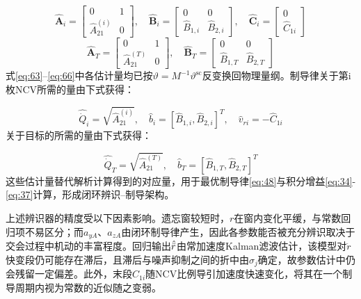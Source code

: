 \begin{equation}
\label{eq:63}
\hat{\mathbf{A}}_{i} = \left[ {\begin{array}{*{20}{c}}
  0&1 \\ 
  {\hat A_{21}^{(i)}}&0 
\end{array}} \right],\quad \hat{\mathbf{B}}_{i} = \left[ {\begin{array}{*{20}{c}}
  0&0 \\ 
  {{{\hat B}_{1,i}}}&{{{\hat B}_{2,i}}} 
\end{array}} \right],\quad \hat{\mathbf{C}}_{i} = \left[ {\begin{array}{*{20}{c}}
  0 \\ 
  {{{\hat C}_{1i}}} 
\end{array}} \right]
\end{equation}
\begin{equation}
\label{eq:64}
\hat{\mathbf{A}}_{T} = \left[ {\begin{array}{*{20}{c}}
  0&1 \\ 
  {\hat A_{21}^{(T)}}&0 
\end{array}} \right],\quad \hat{\mathbf{B}}_{T} = \left[ {\begin{array}{*{20}{c}}
  0&0 \\ 
  {{{\hat B}_{1,T}}}&{{{\hat B}_{2,T}}} 
\end{array}} \right]
\end{equation}
式\eqref{eq:63}--\eqref{eq:66}中各估计量均已按$\vartheta  = {M^{ - 1}}{\vartheta ^{{\text{sc}}}}$反变换回物理量纲。制导律关于第i枚NCV所需的量由下式获得：

\begin{equation}
\label{eq:65}
\hat{\dot Q}_{i} = \sqrt {\hat A_{21}^{(i)}} ,\quad \hat{b}_{i} = {\left[ {{{\hat B}_{1,i}},{{\hat B}_{2,i}}} \right]^T},\quad \hat{v}_{ri} =  - \hat{C}_{1i}
\end{equation}
关于目标的所需的量由下式获得：

\begin{equation}
\label{eq:66}
\hat{\dot Q}_{T} = \sqrt {\hat A_{21}^{(T)}} ,\quad \hat{b}_{T} = {\left[ {{{\hat B}_{1,T}},{{\hat B}_{2,T}}} \right]^T}
\end{equation}
这些估计量替代解析计算得到的对应量，用于最优制导律\eqref{eq:48}与积分增益\eqref{eq:34}-\eqref{eq:37}计算，形成闭环辨识–制导架构。
\begin{remark}
上述辨识器的精度受以下因素影响。遗忘窗较短时，${r}$在窗内变化平缓，与常数回归项不易区分；而${a_{yA}}$、${a_{zA}}$由闭环制导律产生，因此各参数能否被充分辨识取决于交会过程中机动的丰富程度。回归输出$\hat{\ddot{r}}$由常加速度Kalman滤波估计，该模型对$\ddot r$快变段仍可能存在滞后，且滞后与噪声抑制之间的折中由${\sigma _j}$确定，故参数估计中仍会残留一定偏差。此外，末段${C_{1i}}$随NCV比例导引加速度快速变化，将其在一个制导周期内视为常数的近似随之变弱。
\end{remark}

